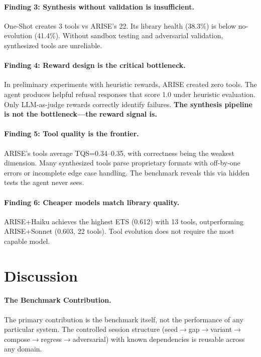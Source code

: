 \documentclass[]{ceurart}
\begin{document}
\paragraph{Finding 3: Synthesis without validation is insufficient.} One-Shot creates 3 tools vs ARISE's 22. Its library health (38.3\%) is below no-evolution (41.4\%). Without sandbox testing and adversarial validation, synthesized tools are unreliable.

\paragraph{Finding 4: Reward design is the critical bottleneck.} In preliminary experiments with heuristic rewards, ARISE created zero tools. The agent produces helpful refusal responses that score 1.0 under heuristic evaluation. Only LLM-as-judge rewards correctly identify failures. \textbf{The synthesis pipeline is not the bottleneck---the reward signal is.}

\paragraph{Finding 5: Tool quality is the frontier.} ARISE's tools average TQS=0.34--0.35, with correctness being the weakest dimension. Many synthesized tools parse proprietary formats with off-by-one errors or incomplete edge case handling. The benchmark reveals this via hidden tests the agent never sees.

\paragraph{Finding 6: Cheaper models match library quality.} ARISE+Haiku achieves the highest ETS (0.612) with 13 tools, outperforming ARISE+Sonnet (0.603, 22 tools). Tool evolution does not require the most capable model.

\section{Discussion}

\paragraph{The Benchmark Contribution.} The primary contribution is the benchmark itself, not the performance of any particular system. The controlled session structure (seed$\to$gap$\to$variant$\to$compose$\to$regress$\to$adversarial) with known dependencies is reusable across any domain.
\end{document}
